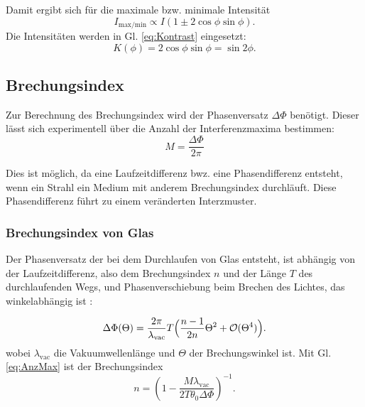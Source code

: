 Damit ergibt sich für die maximale bzw. minimale Intensität
\begin{equation}
  I_{\text{max/min}} \propto I(1\pm 2\cos{\phi}\sin{\phi}).
  \label{eq:imaxmin}
\end{equation}
\noindent Die Intensitäten werden in Gl. \eqref{eq:Kontrast} eingesetzt:
\begin{equation}
  K(\phi)=2\cos{\phi}\sin{\phi}=\sin{2\phi}.
\end{equation}

\subsection{Brechungsindex}%
Zur Berechnung des Brechungsindex wird der Phasenversatz $\Delta \Phi$ benötigt.
Dieser lässt sich experimentell über die Anzahl der Interferenzmaxima bestimmen:
\begin{equation}
  M=\frac{\Delta \Phi}{2\pi}
  \label{eq:AnzMax}
\end{equation}

Dies ist möglich, 
da eine Laufzeitdifferenz bwz. eine Phasendifferenz entsteht,
wenn ein Strahl ein Medium mit anderem Brechungsindex durchläuft.
Diese Phasendifferenz führt zu einem veränderten Interzmuster.

\subsubsection{Brechungsindex von Glas}%
Der Phasenversatz der bei dem Durchlaufen von Glas entsteht,
ist abhängig von der Laufzeitdifferenz, 
also dem Brechungsindex $n$ und der Länge $T$ des durchlaufenden Wegs,
und Phasenverschiebung beim Brechen des Lichtes, das winkelabhängig ist \cite{V64}:

\begin{equation}
\Delta \Phi
(\Theta)=\frac{2\pi}{\lambda_{\text{vac}}}T\Bigl(\frac{n-1}{2n}\Theta^2+\mathcal{O}(\Theta^4)   \Bigr) .
\label{eq:nGlas}
\end{equation}
\noindent wobei $\lambda_{\text{vac}}$ die Vakuumwellenlänge 
und $\Theta$ der Brechungswinkel ist.
Mit Gl. \eqref{eq:AnzMax} ist der Brechungsindex
\begin{equation}
  n = \left(1 - \frac{M \lambda_{\text{vac}}}{2 T \theta_0 \Delta\Phi}\right)^{-1} .
  \label{eq:n_glas}
\end{equation}

